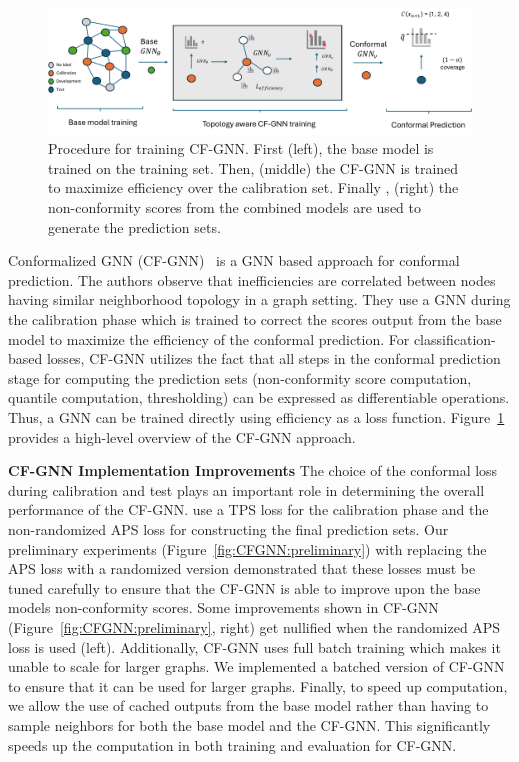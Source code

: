 \begin{figure}
    \centering
    \includegraphics[width=\linewidth]{graphConformal/figures/CFGNN.pdf}
    \caption{Procedure for training CF-GNN. First (left), the base model is trained on the training set. Then, (middle) the CF-GNN is trained to maximize efficiency over the calibration set. Finally , (right) the non-conformity scores from the combined models are used to generate the prediction sets.}
    \label{fig:conformalized_gnn}
\end{figure}

Conformalized GNN (CF-GNN)~\citep{huang2024uncertainty} is a GNN based approach for conformal prediction.
The authors observe that inefficiencies are correlated between nodes having similar neighborhood topology in a graph setting.
They use a GNN during the calibration phase which is trained to correct the scores output from the base model to maximize the efficiency of the conformal prediction.
For classification-based losses, CF-GNN utilizes the fact that all steps in the conformal prediction stage for computing the prediction sets (non-conformity score computation, quantile computation, thresholding) can be expressed as differentiable operations.
Thus, a GNN can be trained directly using efficiency as a loss function.
Figure~\ref{fig:conformalized_gnn} provides a high-level overview of the CF-GNN approach.

\noindent \textbf{CF-GNN Implementation Improvements}
The choice of the conformal loss during calibration and test plays an important role in determining the overall performance of the CF-GNN.
\citet{huang2024uncertainty} use a TPS loss for the calibration phase and the non-randomized APS loss for constructing the final prediction sets.
Our preliminary experiments (Figure~\ref{fig:CFGNN:preliminary}) with replacing the APS loss with a randomized version demonstrated that these losses must be tuned carefully to ensure that the CF-GNN is able to improve upon the base models non-conformity scores.
Some improvements shown in CF-GNN (Figure~\ref{fig:CFGNN:preliminary}, right) get nullified when the randomized APS loss is used (left).
Additionally, CF-GNN uses full batch training which makes it unable to scale for larger graphs.
We implemented a batched version of CF-GNN to ensure that it can be used for larger graphs.
Finally, to speed up computation, we allow the use of cached outputs from the base model rather than having to sample neighbors for both the base model and the CF-GNN. 
This significantly speeds up the computation in both training and evaluation for CF-GNN.

